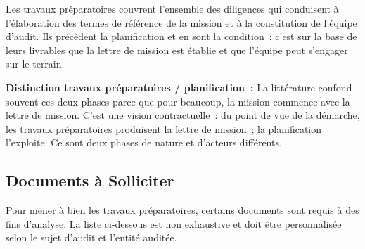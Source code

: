Les travaux préparatoires couvrent l'ensemble des diligences qui conduisent à
l'élaboration des termes de référence de la mission et à la constitution de l'équipe
d'audit. Ils précèdent la planification et en sont la condition~: c'est sur la base
de leurs livrables que la lettre de mission est établie et que l'équipe peut s'engager
sur le terrain.

\begin{boxdef}
\textbf{Distinction travaux préparatoires / planification~:}
La littérature confond souvent ces deux phases parce que pour beaucoup, la mission
commence avec la lettre de mission. C'est une vision contractuelle~: du point de vue
de la démarche, les travaux préparatoires produisent la lettre de mission~; la
planification l'exploite. Ce sont deux phases de nature et d'acteurs différents.
\end{boxdef}

\subsection{Documents à Solliciter}
\label{subsec:docs-solliciter}

Pour mener à bien les travaux préparatoires, certains documents sont requis à des
fins d'analyse. La liste ci-dessous est non exhaustive et doit être personnalisée
selon le sujet d'audit et l'entité auditée.


